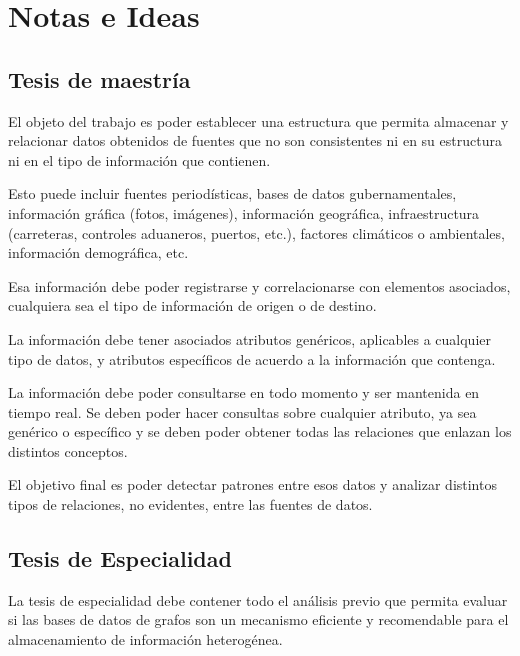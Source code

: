 \documentclass[
	11pt,oneside,a4paper,
	headsepline,footsepline,plainfootsepline,plainheadsepline,
	fleqn,
	flushbottom,
	raggedbottom
]{memoir}
\def\borrador{}
\begin{document}
	\printbibliography[title={Bibliografía adicional},prenote=bibnote,notcategory=cited,resetnumbers=true,omitnumbers=true]
		
	\ifdefined\borrador
	
	\section*{Notas e Ideas}
	
	
	\subsection*{Tesis de maestría}
	El objeto del trabajo es poder establecer una estructura que permita almacenar y relacionar datos obtenidos de fuentes que no son consistentes ni en su estructura ni en el tipo de información que contienen.
	
	Esto puede incluir fuentes periodísticas, bases de datos gubernamentales, información gráfica (fotos, imágenes), información geográfica, infraestructura (carreteras, controles aduaneros, puertos, etc.), factores climáticos o ambientales, información demográfica, etc.
	
	Esa información debe poder registrarse y correlacionarse con elementos asociados, cualquiera sea el tipo de información de origen o de destino.
	
	La información debe tener asociados atributos genéricos, aplicables a cualquier tipo de datos, y atributos específicos de acuerdo a la información que contenga.
	
	La información debe poder consultarse en todo momento y ser mantenida en tiempo real. Se deben poder hacer consultas sobre cualquier atributo, ya sea genérico o específico y se deben poder obtener todas las relaciones que enlazan los distintos conceptos.
	
	El objetivo final es poder detectar patrones entre esos datos y analizar distintos tipos de relaciones, no evidentes, entre las fuentes de datos.
	
	\subsection*{Tesis de Especialidad}
	La tesis de especialidad debe contener todo el análisis previo que permita evaluar si las bases de datos de grafos son un mecanismo eficiente y recomendable para el almacenamiento de información heterogénea.
	
\end{document}
